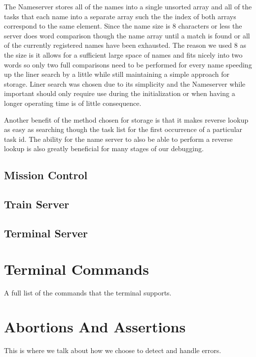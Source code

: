 \documentclass[pdftex,10pt,a4paper]{article}
\begin{document}
The Nameserver stores all of the names into a single unsorted array
and all of the tasks that each name into a separate array such the the
index of both arrays correspond to the same element. Since the name
size is 8 characters or less the server does word comparison though
the name array until a match is found or all of the currently
registered names have been exhausted. The reason we used 8 as the size
is it allows for a sufficient large space of names and fits nicely
into two words so only two full comparisons need to be performed for
every name speeding up the liner search by a little while still
maintaining a simple approach for storage. Liner search was chosen due
to its simplicity and the Nameserver while important should only
require use during the initialization or when having a longer
operating time is of little consequence.

Another benefit of the method chosen for storage is that it makes reverse
lookup as easy as searching though the task list for the first occurrence
of a particular task id. The ability for the name server to also be able to
perform a reverse lookup is also greatly beneficial for many stages of our
debugging.

\subsection*{Mission Control}

\subsection*{Train Server}

\subsection*{Terminal Server}


\section*{Terminal Commands}

A full list of the commands that the terminal supports.

\section*{Abortions And Assertions}

This is where we talk about how we choose to detect and handle errors.
\end{document}
